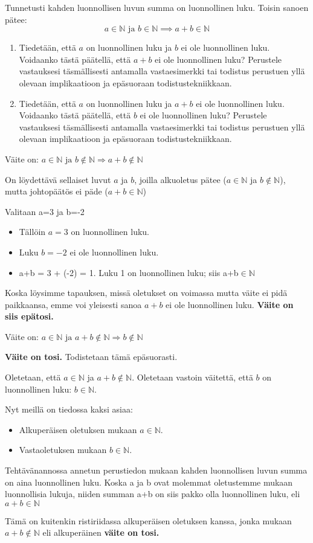 \documentclass[12pt,a4paper]{article}
\newcommand{\N}{\mathbb{N}}
\begin{document}
\pagebreak
{}
  Tunnetusti kahden luonnollisen luvun summa on luonnollinen luku. Toisin sanoen pätee:
  \[
    a\in \N \textrm{ ja } b\in \N \implies a + b\in\N
  \]
  \begin{enumerate}
  \item Tiedetään, että $a$ on luonnollinen luku ja $b$ ei ole luonnollinen luku. Voidaanko tästä päätellä, että $a + b$ ei ole luonnollinen luku? Perustele vastauksesi täsmällisesti antamalla vastaesimerkki tai todistus perustuen yllä olevaan implikaatioon ja epäsuoraan todistustekniikkaan.
  \item Tiedetään, että $a$ on luonnollinen luku ja $a + b$ ei ole luonnollinen luku. Voidaanko tästä päätellä, että $b$ ei ole luonnollinen luku? Perustele vastauksesi täsmällisesti antamalla vastaesimerkki tai todistus perustuen yllä olevaan implikaatioon ja epäsuoraan todistustekniikkaan.
  \end{enumerate}



  \begin{alakohta}
  \item %
    Väite on: $a\in\N \textrm{ ja } b\notin\N \Rightarrow a+b\notin\N$

    On löydettävä sellaiset luvut $a$ ja $b$, joilla alkuoletus pätee
    ($a\in\N$ ja $b\notin\N$), mutta johtopäätös ei päde ($a+b\in\N$)

    Valitaan a=3 ja b=-2
    \begin{itemize}
      \item Tällöin $a=3$ on luonnollinen luku.
      \item Luku $b=-2$ ei ole luonnollinen luku.
      \item a+b = 3 + (-2) = 1. Luku 1 on luonnollinen luku; siis a+b$\in\N$
    \end{itemize}
    Koska löysimme tapauksen, missä oletukset on voimassa mutta väite
    ei pidä paikkaansa, emme voi yleisesti sanoa $a+b$ ei ole
    luonnollinen luku. \textbf{Väite on siis epätosi.} 

  \item %
    Väite on: $a\in\N \textrm{ ja } a+b\notin\N \Rightarrow b\notin\N$

    \textbf{Väite on tosi.} Todistetaan tämä epäsuorasti.

    Oletetaan, että $a\in\N$ ja $a+b\notin\N$. Oletetaan vastoin väitettä,
    että $b$ on luonnollinen luku: $b\in\N$.

    Nyt meillä on tiedossa kaksi asiaa:
    \begin{itemize}
      \item Alkuperäisen oletuksen mukaan $a\in\N$.
      \item Vastaoletuksen mukaan $b\in\N$.
    \end{itemize}
    Tehtävänannossa annetun perustiedon mukaan kahden luonnollisen luvun
    summa on aina luonnollinen luku. Koska a ja b ovat molemmat
    oletustemme mukaan luonnollisia lukuja, niiden summan a+b on siis
    pakko olla luonnollinen luku, eli $a+b\in\N$

    Tämä on kuitenkin ristiriidassa alkuperäisen oletuksen kanssa,
    jonka mukaan $a+b\notin\N$ eli alkuperäinen \textbf{väite on tosi.} 
\end{alakohta}
\end{document}

